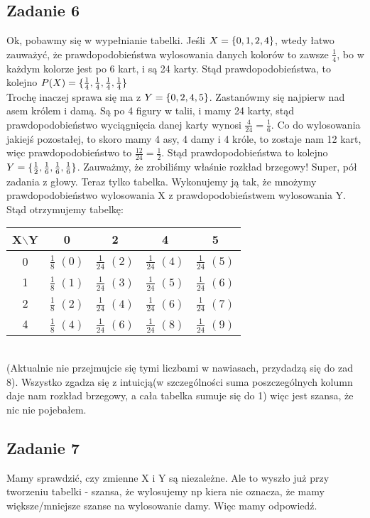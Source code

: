 \documentclass[a4paper]{article}
\DeclarePairedDelimiter\set{\lbrace}{\rbrace}
\begin{document}
\subsection*{Zadanie 6}
Ok, pobawmy się w wypełnianie tabelki. Jeśli $X=\set{0,1,2,4}$, wtedy łatwo zauważyć, że prawdopodobieństwa wylosowania danych kolorów to zawsze $\frac{1}{4}$, bo w każdym kolorze jest po 6 kart, i są 24 karty. Stąd prawdopodobieństwa, to kolejno $P(X)=\set{\frac{1}{4},\frac{1}{4},\frac{1}{4},\frac{1}{4}}$\\
Trochę inaczej sprawa się ma z $Y=\set{0,2,4,5}$. Zastanówmy się najpierw nad asem królem i damą. Są po 4 figury w talii, i mamy 24 karty, stąd prawdopodobieństwo wyciągnięcia danej karty wynosi $\frac{4}{24}=\frac{1}{6}$. Co do wylosowania jakiejś pozostałej, to skoro mamy 4 asy, 4 damy i 4 króle, to zostaje nam 12 kart, więc prawdopodobieństwo to $\frac{12}{24}=\frac{1}{2}$. Stąd prawdopodobieństwa to kolejno $Y=\set{\frac{1}{2},\frac{1}{6},\frac{1}{6},\frac{1}{6}}$. Zauważmy, że zrobiliśmy właśnie rozkład brzegowy! Super, pół zadania z głowy. Teraz tylko tabelka. Wykonujemy ją tak, że mnożymy prawdopodobieństwo wylosowania X z prawdopodobieństwem wylosowania Y. Stąd otrzymujemy tabelkę:

\begin{tabular}{c *{4}{|c}}
X$\backslash$Y & 0 & 2 & 4 & 5 \\ & $\frac{1}{8}$ $(0)$ & $\frac{1}{24}$ $(2)$ & $\frac{1}{24}$ $(4)$ & $\frac{1}{24}$ $(5)$\\ & $\frac{1}{8}$ $(1)$ & $\frac{1}{24}$ $(3)$ & $\frac{1}{24}$ $(5)$ & $\frac{1}{24}$ $(6)$\\ & $\frac{1}{8}$ $(2)$ & $\frac{1}{24}$ $(4)$ & $\frac{1}{24}$ $(6)$ & $\frac{1}{24}$ $(7)$\\ &	$\frac{1}{8}$ $(4)$ & $\frac{1}{24}$ $(6)$ & $\frac{1}{24}$ $(8)$& $\frac{1}{24}$ $(9)$\\
\end{tabular}\\
(Aktualnie nie przejmujcie się tymi liczbami w nawiasach, przydadzą się do zad 8).
Wszystko zgadza się z intuicją(w szczególności suma poszczególnych kolumn daje nam rozkład brzegowy, a cała tabelka sumuje się do 1) więc jest szansa, że nic nie pojebałem.

\subsection*{Zadanie 7}
Mamy sprawdzić, czy zmienne X i Y są niezależne. Ale to wyszło już przy tworzeniu tabelki - szansa, że wylosujemy np kiera nie oznacza, że mamy większe/mniejsze szanse na wylosowanie damy. Więc mamy odpowiedź.
\end{document}
